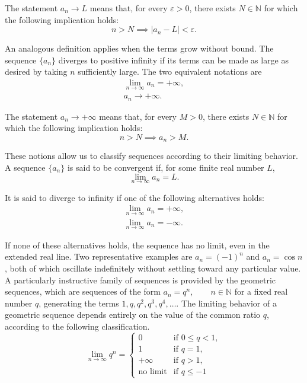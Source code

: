 \begin{definition}
The statement $a_n \to L$ means that, for every $\varepsilon > 0$, there exists $N \in \mathbb{N}$ for which the following implication holds:
\[
n > N \implies |a_n - L| < \varepsilon.
\]

\end{definition}

An analogous definition applies when the terms grow without bound. The sequence $\{a_n\}$ diverges to positive infinity if its terms can be made as large as desired by taking $n$ sufficiently large. The two equivalent notations are
\[
\begin{gathered}
\lim_{n \to \infty} a_n = +\infty, \\
a_n \to +\infty.
\end{gathered}
\]

\begin{definition}
The statement $a_n \to +\infty$ means that, for every $M > 0$, there exists $N \in \mathbb{N}$ for which the following implication holds:
\[
n > N \implies a_n > M.
\]

\end{definition}

These notions allow us to classify sequences according to their limiting behavior. A sequence
$\{a_n\}$ is said to be convergent if, for some finite real number $L$,
\[
\lim_{n \to \infty} a_n = L.
\]

It is said to diverge to infinity if one of the following alternatives holds:
\[
\begin{gathered}
\lim_{n \to \infty} a_n = +\infty, \\
\lim_{n \to \infty} a_n = -\infty.
\end{gathered}
\]

If none of these alternatives holds, the sequence has no limit, even in the extended real line. Two representative examples are $a_n = (-1)^n$ and $a_n = \cos n$,
both of which oscillate indefinitely without settling toward any particular value. A particularly instructive
family of sequences is provided by the geometric sequences, which are sequences of the form $a_n = q^n, \qquad n \in \mathbb{N}$ for a fixed real number $q$, generating the terms $1, q, q^2, q^3, q^4, \dots$. The limiting behavior of a
geometric sequence depends entirely on the value of the common ratio $q$, according to the following
classification.
\[
\lim_{n \to \infty} q^n =
\begin{cases}
0 & \text{if } 0 \leq q < 1, \\
1 & \text{if } q = 1, \\
+\infty & \text{if } q > 1, \\
\text{no limit} & \text{if } q \leq -1
\end{cases}
\]

